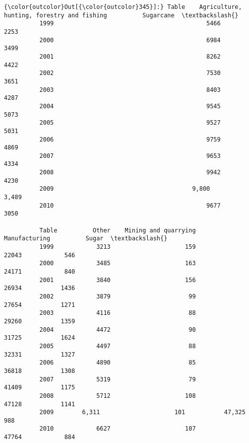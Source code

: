 \documentclass[11pt]{article}
\begin{document}
\begin{Verbatim}[commandchars=\\\{\}]
{\color{outcolor}Out[{\color{outcolor}345}]:} Table    Agriculture, hunting, forestry and fishing          Sugarcane  \textbackslash{}
          1999                                           5466               2253   
          2000                                           6984               3499   
          2001                                           8262               4422   
          2002                                           7530               3651   
          2003                                           8403               4287   
          2004                                           9545               5073   
          2005                                           9527               5031   
          2006                                           9759               4869   
          2007                                           9653               4334   
          2008                                           9942               4230   
          2009                                       9,800              3,489      
          2010                                           9677               3050   
          
          Table          Other    Mining and quarrying    Manufacturing          Sugar  \textbackslash{}
          1999            3213                     159            22043            546   
          2000            3485                     163            24171            840   
          2001            3840                     156            26934           1436   
          2002            3879                      99            27654           1271   
          2003            4116                      88            29260           1359   
          2004            4472                      90            31725           1624   
          2005            4497                      88            32331           1327   
          2006            4890                      85            36818           1308   
          2007            5319                      79            41409           1175   
          2008            5712                     108            47128           1141   
          2009        6,311                     101           47,325            988      
          2010            6627                     107            47764            884   
          

\end{Verbatim}
\end{document}
